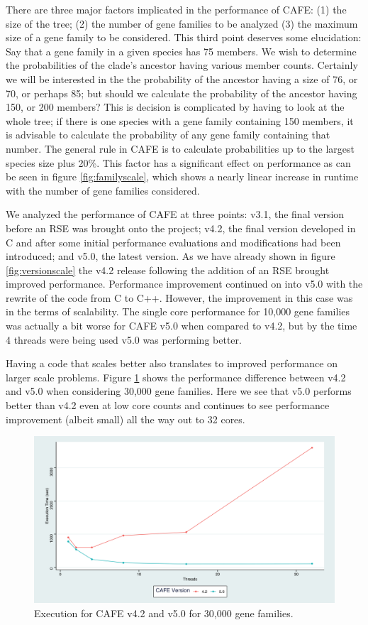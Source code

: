 \documentclass[acmtog, authorversion]{acmart}
\begin{document}
There are three major factors implicated in the performance of CAFE: (1) the size of the tree; (2) the number of gene families to be analyzed (3) the maximum size of a gene family to be considered. This third point deserves some elucidation: Say that a gene family in a given species has 75 members. We wish to determine the probabilities of the clade's ancestor having various member counts. Certainly we will be interested in the the probability of the ancestor having a size of 76, or 70, or perhaps 85; but should we calculate the probability of the ancestor having 150, or 200 members? This is decision is complicated by having to look at the whole tree; if there is one species with a gene family containing 150 members, it is advisable to calculate the probability of any gene family containing that number. The general rule in CAFE is to calculate probabilities up to the largest species size plus 20\%. This factor has a significant effect on performance as can be seen in figure \ref{fig:familyscale}, which shows a nearly linear increase in runtime with the number of gene families considered.

We analyzed the performance of CAFE at three points: v3.1, the final version before an RSE was brought onto the project; v4.2, the final version developed in C and after some initial performance evaluations and modifications had been introduced; and v5.0, the latest version. As we have already shown in figure \ref{fig:versionscale} the v4.2 release following the addition of an RSE brought improved performance. Performance improvement continued on into v5.0 with the rewrite of the code from C to C++. However, the improvement in this case was in the terms of scalability. The single core performance for 10,000 gene families was actually a bit worse for CAFE v5.0 when compared to v4.2, but by the time 4 threads were being used v5.0 was performing better.

Having a code that scales better also translates to improved performance on larger scale problems. Figure \ref{fig:bigscale} shows the performance difference between v4.2 and v5.0 when considering 30,000 gene families. Here we see that v5.0 performs better than v4.2 even at low core counts and continues to see performance improvement (albeit small) all the way out to 32 cores.

\begin{figure}[t] \label{fig:bigscale}
\includegraphics[scale = 0.075]{BigThreadsVersion}
\caption{Execution for CAFE v4.2 and v5.0 for 30,000 gene families.}
\end{figure}
\end{document}

